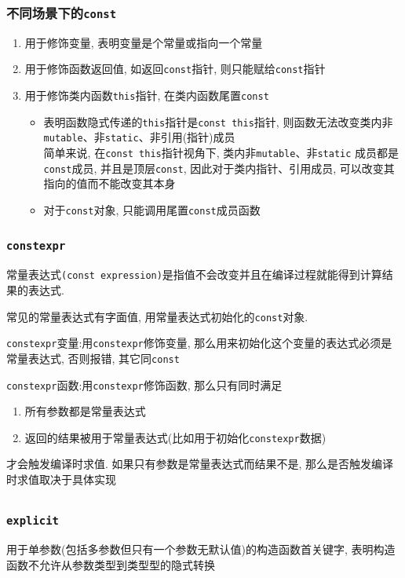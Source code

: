 \subsubsection{不同场景下的{\tt const}}
\begin{enumerate}
	\item 用于修饰变量, 表明变量是个常量或指向一个常量
	\item 用于修饰函数返回值, 如返回{\tt const}指针, 则只能赋给{\tt const}指针
	\item 用于修饰类内函数{\tt this}指针, 在类内函数尾置{\tt const}
	\begin{itemize}
		\item 表明函数隐式传递的{\tt this}指针是{\tt const this}指针,
				则函数无法改变类内非{\tt mutable}、非{\tt static}、非引用(指针)成员
			 \\ 简单来说, 在{\tt const this}指针视角下, 类内非{\tt mutable}、非{\tt static}
			 	成员都是{\tt const}成员, 并且是顶层{\tt const}, 因此对于类内指针、引用成员, 
				可以改变其指向的值而不能改变其本身
		\item 对于{\tt const}对象, 只能调用尾置{\tt const}成员函数
	\end{itemize}
\end{enumerate}
\subsubsection{\tt constexpr}
常量表达式{\tt (const expression)}是指值不会改变并且在编译过程就能得到计算结果的表达式.

常见的常量表达式有字面值, 用常量表达式初始化的{\tt const}对象.

{\tt constexpr}变量:\quad 用{\tt constexpr}修饰变量, 那么用来初始化这个变量的表达式必须是常量表达式, 否则报错, 其它同{\tt const}

{\tt constexpr}函数:\quad 用{\tt constexpr}修饰函数, 那么只有同时满足
\begin{enumerate}
	\item 所有参数都是常量表达式
	\item 返回的结果被用于常量表达式(比如用于初始化{\tt constexpr}数据)
\end{enumerate}

才会触发编译时求值. 如果只有参数是常量表达式而结果不是, 那么是否触发编译时求值取决于具体实现

\subsection{\color{purple}{其它关键字}}
\subsubsection{\tt explicit}
用于单参数(包括多参数但只有一个参数无默认值)的构造函数首关键字, 表明构造函数不允许从参数类型到类型型的隐式转换
